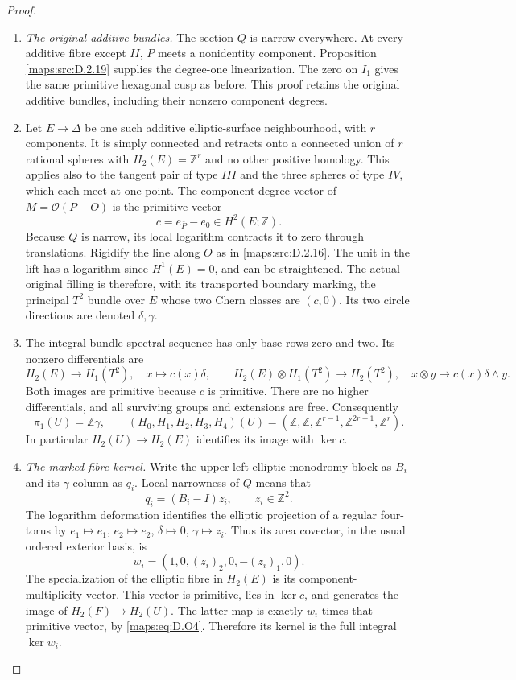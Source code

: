 \begin{proof}
\begin{enumerate}[label=\arabic*.,leftmargin=*]
\item \emph{The original additive bundles.}
The section $Q$ is narrow everywhere. At every additive
fibre except $II$, $P$ meets a nonidentity component.
Proposition \ref{maps:src:D.2.19} supplies the degree-one linearization.
The zero on $I_1$ gives the same primitive hexagonal
cusp as before. This proof retains the original additive
bundles, including their nonzero component degrees.

\item Let $E\to\Delta$ be one such additive elliptic-surface
neighbourhood, with $r$ components. It is simply connected
and retracts onto a connected union of $r$ rational spheres
with $H_2(E)=\mathbb Z^r$ and no other positive homology.
This applies also to the tangent pair of type $III$ and
the three spheres of type $IV$, which each meet at one
point. The component degree vector of $M=\mathcal O(P-O)$
is the primitive vector
\[
                   c=e_{\bar P}-e_0\in H^2(E;\mathbb Z).
\]
Because $Q$ is narrow, its local logarithm contracts it
to zero through translations. Rigidify the line along
$O$ as in \ref{maps:src:D.2.16}. The unit in the lift has a logarithm
since $H^1(E)=0$, and can be straightened. The actual
original filling is therefore, with its transported
boundary marking, the principal $T^2$ bundle over $E$
whose two Chern classes are $(c,0)$. Its two circle
directions are denoted $\delta,\gamma$.

\item The integral bundle spectral sequence has only base
rows zero and two. Its nonzero differentials are
\[
 H_2(E)\longrightarrow H_1(T^2),\quad x\longmapsto c(x)\delta,
 \qquad
 H_2(E)\otimes H_1(T^2)\longrightarrow H_2(T^2),\quad
 x\otimes y\longmapsto c(x)\delta\wedge y.
\]
Both images are primitive because $c$ is primitive.
There are no higher differentials, and all surviving
groups and extensions are free. Consequently
\[
 \pi_1(U)=\mathbb Z\gamma,\qquad
 (H_0,H_1,H_2,H_3,H_4)(U)
  =(\mathbb Z,\mathbb Z,\mathbb Z^{r-1},
                             \mathbb Z^{2r-1},\mathbb Z^r).
 \tag{D.O4}\label{maps:eq:D.O4}
\]
In particular $H_2(U)\to H_2(E)$ identifies its image
with $\ker c$.

\item \emph{The marked fibre kernel.}
Write the upper-left elliptic monodromy block as $B_i$
and its $\gamma$ column as $q_i$. Local narrowness of $Q$
means that
\[
                 q_i=(B_i-I)z_i,\qquad z_i\in\mathbb Z^2.
\]
The logarithm deformation identifies the elliptic
projection of a regular four-torus by
$e_1\mapsto e_1$, $e_2\mapsto e_2$, $\delta\mapsto0$,
$\gamma\mapsto z_i$. Thus its area covector, in the
usual ordered exterior basis, is
\[
           w_i=(1,0,(z_i)_2,0,-(z_i)_1,0).
 \tag{D.O5}\label{maps:eq:D.O5}
\]
The specialization of the elliptic fibre in $H_2(E)$
is its component-multiplicity vector. This vector is
primitive, lies in $\ker c$, and generates the image
of $H_2(F)\to H_2(U)$. The latter map is exactly
$w_i$ times that primitive vector, by \eqref{maps:eq:D.O4}.
Therefore its kernel is the full integral $\ker w_i$.


\end{enumerate}
\end{proof}
